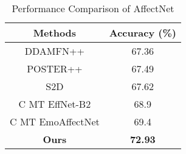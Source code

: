 \begin{table}
    \centering
    \small
    \caption{Performance Comparison of AffectNet}
    \setlength{\tabcolsep}{20pt}
    \begin{tabular}{|c|c|}
        \hline
         \textbf{Methods} & \textbf{Accuracy (\%)} \\
         \hline

         DDAMFN++ \cite{zhang2023dual} & 67.36 \\
         \hline
         POSTER++ \cite{poster++} & 67.49 \\
         \hline
         S2D \cite{s2d} & 67.62 \\
         \hline
         C MT EffNet-B2 \cite{kollias2024distribution} & 68.9 \\
         \hline
         C MT EmoAffectNet \cite{kollias2024distribution} & 69.4 \\
         \hline
         \textbf{Ours} & \textbf{72.93} \\
         \hline
    \end{tabular}
\end{table}
